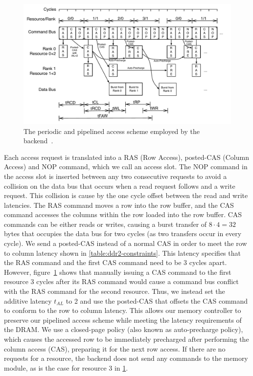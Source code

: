 \begin{figure}
\begin{center}
\includegraphics[width=0.92\linewidth]{figs/backend}
\end{center} 
\caption{\small{The periodic and pipelined access scheme employed by the backend~\cite{ReinekeLiuPatelKimLee11_PRETDRAMControllerBankPrivatizationForPredictability}.}}\label{fig:backend}
\end{figure}

Each access request is translated into a RAS (Row Access), posted-CAS (Column Access) and NOP command, which we call an access slot. 
The NOP command in the access slot is inserted between any two consecutive requests to avoid a collision on the data bus that occurs when a read request follows and a write request.
This collision is cause by the one cycle offset between the read and write latencies. 
The RAS command moves a row into the row buffer, and the CAS command accesses the columns within the row loaded into the row buffer. 
CAS commands can be either reads or writes, causing a burst transfer of $8 \cdot 4 = 32$ bytes that occupies the data bus for two cycles (as two transfers occur in every cycle).
We send a posted-CAS instead of a normal CAS in order to meet the row to column latency shown in \ref{table:ddr2-constraints}.
This latency specifies that the RAS command and the first CAS command need to be 3 cycles apart.  
However, figure~\ref{fig:backend} shows that manually issuing a CAS command to the first resource 3 cycles after its RAS command would cause a command bus conflict with the RAS command for the second resource.
Thus, we instead set the additive latency $t_{AL}$ to 2 and use the posted-CAS that offsets the CAS command to conform to the row to column latency.
This allows our memory controller to preserve our pipelined access scheme while meeting the latency requirements of the DRAM.   
We use a closed-page policy (also known as auto-precharge policy), which causes the accessed row to be immediately precharged after performing the column access (CAS), preparing it for the next row access.
If there are no requests for a resource, the backend does not send any commands to the memory module, as is the case for resource 3 in \ref{fig:backend}.

